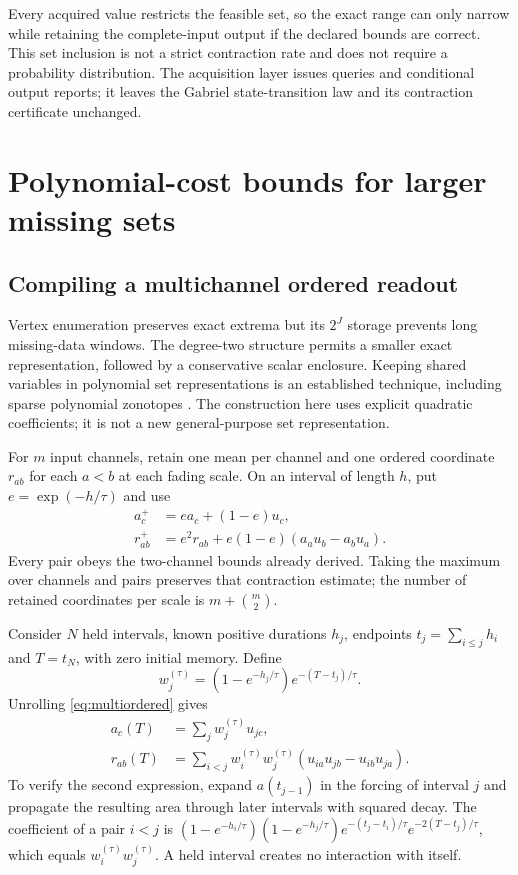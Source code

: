 \documentclass[11pt,a4paper]{article}
\theoremstyle{definition}\newtheorem{definition}[theorem]{Definition}
\begin{document}
Every acquired value restricts the feasible set, so the exact range can only narrow while retaining the complete-input output if the declared bounds are correct. This set inclusion is not a strict contraction rate and does not require a probability distribution. The acquisition layer issues queries and conditional output reports; it leaves the Gabriel state-transition law and its contraction certificate unchanged.

\section{Polynomial-cost bounds for larger missing sets}\label{sec:scalable}
\subsection{Compiling a multichannel ordered readout}
Vertex enumeration preserves exact extrema but its $2^J$ storage prevents long missing-data windows. The degree-two structure permits a smaller exact representation, followed by a conservative scalar enclosure. Keeping shared variables in polynomial set representations is an established technique, including sparse polynomial zonotopes \cite{kochdumper2021}. The construction here uses explicit quadratic coefficients; it is not a new general-purpose set representation.

For $m$ input channels, retain one mean per channel and one ordered coordinate $r_{ab}$ for each $a<b$ at each fading scale. On an interval of length $h$, put $e=\exp(-h/\tau)$ and use
\begin{align}
 a_c^+&=ea_c+(1-e)u_c,\\
 r_{ab}^+&=e^2r_{ab}+e(1-e)(a_au_b-a_bu_a).
 \label{eq:multiordered}
\end{align}
Every pair obeys the two-channel bounds already derived. Taking the maximum over channels and pairs preserves that contraction estimate; the number of retained coordinates per scale is $m+\binom m2$.

Consider $N$ held intervals, known positive durations $h_j$, endpoints $t_j=\sum_{i\leq j}h_i$ and $T=t_N$, with zero initial memory. Define
\begin{equation}
 w_j^{(\tau)}=(1-e^{-h_j/\tau})e^{-(T-t_j)/\tau}.
\end{equation}
Unrolling \eqref{eq:multiordered} gives
\begin{align}
 a_c(T)&=\sum_j w_j^{(\tau)}u_{jc},\\
 r_{ab}(T)&=\sum_{i<j}w_i^{(\tau)}w_j^{(\tau)}
       (u_{ia}u_{jb}-u_{ib}u_{ja}).\label{eq:polynomialarea}
\end{align}
To verify the second expression, expand $a(t_{j-1})$ in the forcing of interval $j$ and propagate the resulting area through later intervals with squared decay. The coefficient of a pair $i<j$ is
$(1-e^{-h_i/\tau})(1-e^{-h_j/\tau})
e^{-(t_j-t_i)/\tau}e^{-2(T-t_j)/\tau}$,
which equals $w_i^{(\tau)}w_j^{(\tau)}$. A held interval creates no interaction with itself.
\end{document}
